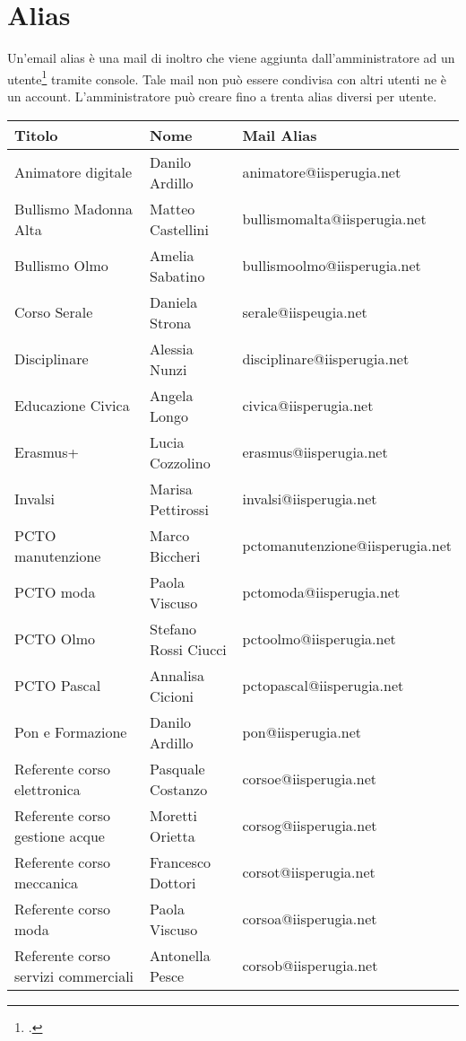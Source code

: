 \section{Alias}
Un'email alias è una mail di inoltro che viene aggiunta dall'amministratore ad un utente\footcite{Google2023d} tramite console. Tale mail non può essere condivisa con altri utenti ne è un account.
L'amministratore può creare fino a trenta alias diversi per utente.
\begin{center}
	
\begin{tabular}{lll}
	\toprule 
	Titolo&Nome&Mail Alias\\
	\midrule
	Animatore digitale&
	Danilo Ardillo&
	animatore@iisperugia.net\\
	Bullismo Madonna Alta&
	Matteo Castellini&
	bullismomalta@iisperugia.net\\
	Bullismo Olmo&
	Amelia Sabatino&
	bullismoolmo@iisperugia.net\\
	Corso Serale&
	Daniela Strona&
	serale@iispeugia.net\\
	Disciplinare&
	Alessia Nunzi&
	disciplinare@iisperugia.net\\
	Educazione Civica&
	Angela Longo&
	civica@iisperugia.net\\
	Erasmus+&
	Lucia Cozzolino&
	erasmus@iisperugia.net\\
	Invalsi&
	Marisa Pettirossi&
	invalsi@iisperugia.net\\
	PCTO manutenzione&
	Marco Biccheri&
	pctomanutenzione@iisperugia.net\\
	PCTO moda&
	Paola Viscuso&
	pctomoda@iisperugia.net\\
	PCTO Olmo&
	Stefano Rossi Ciucci&
	pctoolmo@iisperugia.net\\
	PCTO Pascal&
	Annalisa Cicioni&
	pctopascal@iisperugia.net\\
	Pon e Formazione&
	Danilo Ardillo&
	pon@iisperugia.net\\
	Referente corso elettronica&
	Pasquale Costanzo&
	corsoe@iisperugia.net\\
	Referente corso gestione acque&
	Moretti Orietta&
	corsog@iisperugia.net\\
	Referente corso meccanica&
	Francesco Dottori&
	corsot@iisperugia.net\\
	Referente corso moda&
	Paola Viscuso&
	corsoa@iisperugia.net\\
	Referente corso servizi commerciali&
	Antonella Pesce&
	corsob@iisperugia.net\\

\end{tabular}
\end{center}
